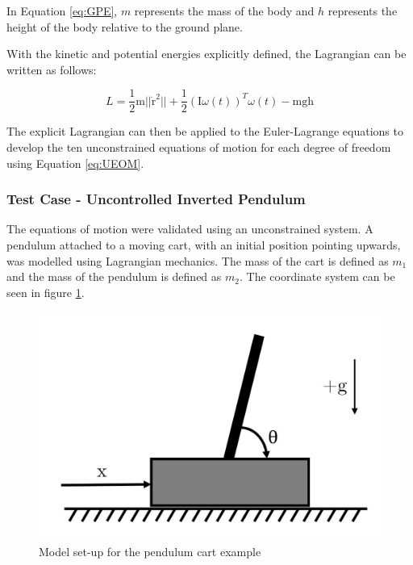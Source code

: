 In Equation \ref{eq:GPE}, $m$ represents the mass of the body and $h$ represents the height of the body relative to the ground plane.

With the kinetic and potential energies explicitly defined, the Lagrangian can be written as follows:

\begin{equation}
L= \frac{1}{2}{\text{m}}{\lvert \lvert {\dot{\text{r}}^2} \rvert \rvert} + \frac{1}{2}({\text{I}}{\omega(t)})^T\omega(t) - {\text{m}}{\text{g}}{\text{h}}
\end{equation}

The explicit Lagrangian can then be applied to the Euler-Lagrange equations to develop the ten unconstrained equations of motion for each degree of freedom using Equation \ref{eq:UEOM}.

\subsubsection{Test Case - Uncontrolled Inverted Pendulum}\label{sec:testcaseip}

The equations of motion were validated using an unconstrained system. A pendulum attached to a moving cart, with an initial position pointing upwards, was modelled using Lagrangian mechanics. 
The mass of the cart is defined as $m_{1}$ and the mass of the pendulum is defined as $m_{2}$. 
The coordinate system can be seen in figure \ref{fig:pendulumcart}.

\begin{figure}[!htb]
	\centering
	\includegraphics[width=\linewidth]{pendulumcart}
	\caption{Model set-up for the pendulum cart example}\label{fig:pendulumcart}
	\endminipage
\end{figure} 

